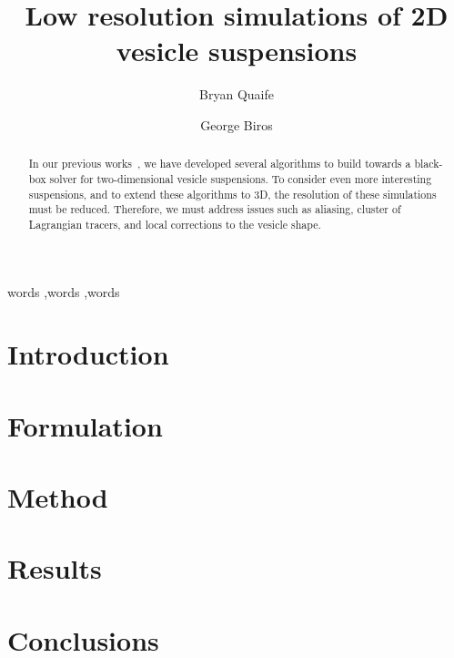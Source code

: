\documentclass[preprint, 10pt]{elsarticle}
\begin{document}
\title{Low resolution simulations of 2D vesicle suspensions}

\author[ut]{Bryan Quaife} 
\author[ut]{George Biros}
\address[ut]{Institute of Computational Engineering and Sciences,\\
  The University of Texas at Austin, Austin, TX, 78712.}

\begin{abstract} 
In our previous works~\cite{}, we have developed several algorithms to
build towards a black-box solver for two-dimensional vesicle
suspensions.  To consider even more interesting suspensions, and to
extend these algorithms to 3D, the resolution of these simulations must
be reduced.  Therefore, we must address issues such as aliasing, cluster
of Lagrangian tracers, and local corrections to the vesicle shape.
\end{abstract}

\begin{keyword}
  words \sep words \sep words
\end{keyword}

\maketitle

\section{Introduction\label{s:introduction}}


\section{Formulation\label{s:formulation}}


\section{Method\label{s:method}}


\section{Results\label{s:results}}


\section{Conclusions\label{s:conclusions}}



\begin{appendices}
\end{appendices}


 

\end{document}
